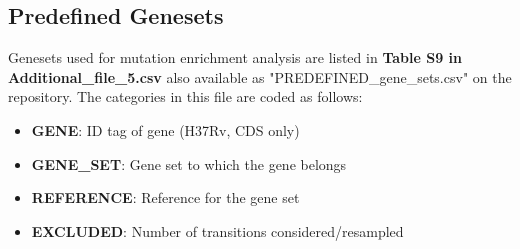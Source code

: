 \documentclass[12pt, oneside]{article}   	%
\begin{document}
\subsection{Predefined Genesets}
Genesets used for mutation enrichment analysis are listed in \textbf{Table S9 in Additional\_file\_5.csv} also available as "PREDEFINED\_gene\_sets.csv" on the repository.
The categories in this file are coded as follows:
\begin{itemize}
\item \textbf{GENE}: ID tag of gene (H37Rv, CDS only)
\item \textbf{GENE\_SET}: Gene set to which the gene belongs
\item \textbf{REFERENCE}: Reference for the gene set
\item \textbf{EXCLUDED}: Number of transitions considered/resampled
\end{itemize}
\end{document}
